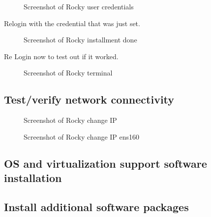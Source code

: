 \documentclass{article}
\begin{document}
		\FloatBarrier
		\begin{figure}[h!]
			\centering
			\caption{Screenshot of Rocky user credentials}
		\end{figure}
		\FloatBarrier


	Relogin with the credential that was just set.

		\FloatBarrier
		\begin{figure}[h!]
			\centering
			\caption{Screenshot of Rocky installment done}
		\end{figure}
		\FloatBarrier


	Re Login now to test out if it worked.

		\FloatBarrier
		\begin{figure}[h!]
			\centering
			\caption{Screenshot of Rocky terminal}
		\end{figure}
		\FloatBarrier


	\FloatBarrier
	\subsection{Test/verify network connectivity}
	\label{subsec:Test/verify network connectivityID}

	

		\FloatBarrier
		\begin{figure}[h!]
			\centering
			\caption{Screenshot of Rocky change IP}
		\end{figure}
		\FloatBarrier


	

		\FloatBarrier
		\begin{figure}[h!]
			\centering
			\caption{Screenshot of Rocky change IP ens160}
		\end{figure}
		\FloatBarrier


	\FloatBarrier
	\subsection{OS and virtualization support software installation}
	\label{subsec:OS and virtualization support software installationID}

	

	\FloatBarrier
	\subsection{Install additional software packages}
	\label{subsec:Install additional software packagesID}
\end{document}
